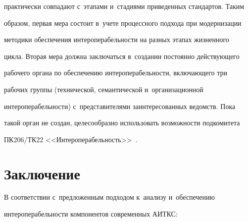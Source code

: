практически совпадают с~этапами и~стадиями приведенных стандартов. Таким 

образом, первая мера состоит в~учете процессного подхода при модернизации 

методики обеспечения интероперабельности на разных этапах жизненного 

цикла. Вторая мера должна заключаться в~создании постоянно действующего 

рабочего органа по обеспечению интероперабельности, включающего три 

рабочих группы (технической, семантической и~организационной 

интероперабельности) с~представителями заинтересованных ведомств. Пока 

такой орган не создан, целесообразно использовать возможности подкомитета 

ПК206/ТК22 <<Интероперабельность>>~\cite{9-ba}. 



\vspace*{-4pt}

  

\section{Заключение}



\vspace*{-2pt}



  В соответствии с~предложенным подходом к~анализу и~обеспечению 

ин\-тер\-опе\-ра\-бель\-ности компонентов современных АИТКС: 

